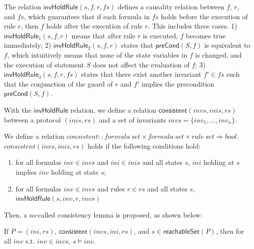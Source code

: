 \documentclass{llncs}
\begin{document}
The relation $\mathsf{invHoldRule}(s, f,r,fs)$ defines a causality relation
between $f$, $r$, and $fs$, which guarantees that if each formula in $fs$ holds
before the execution of rule $r$, then $f$ holds after the execution of rule $r$. This includes three cases. 1) $\mathsf{invHoldRule}_1(s,f, r)$ means that after rule $r$ is executed, $f$ becomes true immediately;   2) $\mathsf{invHoldRule}_2(s,f, r)$ states that $\mathsf{preCond}(S,f)$ is equivalent to $f$, which intuitively means that none of the state variables in $f$ is changed, and the execution of statement $S$ does not affect the evaluation of $f$;
 3) $\mathsf{invHoldRule}_3(s,f, r,fs)$ states that there exist another invariant $f' \in fs$ such that
  the conjunction of the guard of $r$ and $f'$ implies the precondition  $\mathsf{preCond}(S,f)$.

With the $\mathsf{invHoldRule}$ relation, we define a   relation $\mathsf{consistent}( invs,inis, rs)$ between a protocol $(inis,rs)$ and a set of invariants $invs=\{inv_1,\ldots, inv_n\}$.

\begin{definition}
We define a relation $consistent::formula~ set \times formula~ set
\times rule ~set \Rightarrow bool$.
 $consistent( invs,inis, rs)$ holds if the following conditions hold:
\begin{enumerate}
\item for all formulas $inv\in invs$ and $ini\in inis$ and all states $s$, $ini$ holding at
$s $ implies $inv$ holding at state $s $;
\item for all formulas $inv\in invs$ and rules  $r \in rs$ and all states $s$,  $\mathsf{invHoldRule}(s, inv, r, invs   )$
\end{enumerate}
\end{definition}

Then, a
so-called consistency lemma is proposed, as shown below:


\begin{lemma}\label{consistentLemma}%
 If $P=(ini,rs)$, $\mathsf{consistent}( invs, ini, rs)$, and $s  \in \mathsf{reachableSet}(P)$, %
 then   for all $inv$ s.t. $inv \in invs$, $s \models inv $.
\end{lemma}
\end{document}
